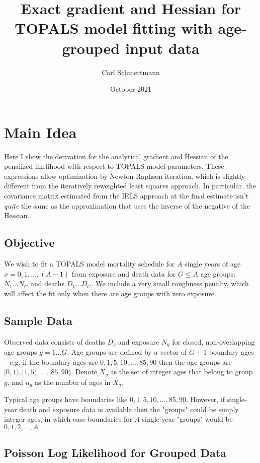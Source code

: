 \documentclass{article}
\title{Exact gradient and Hessian for TOPALS model fitting with age-grouped input data}
\author{Carl Schmertmann}
\date{October 2021}
\begin{document}
\maketitle



\section{Main Idea}

Here I show the derivation for the analytical gradient and Hessian of the penalized likelihood with respect to TOPALS model parameters. These expressions allow optimization by Newton-Raphson iteration, which is slightly different from the iteratively reweighted least squares approach. In particular, the covariance matrix estimated from the IRLS approach at the final estimate isn't \textit{quite} the same as the approximation that uses the inverse of the negative of the Hessian.

\subsection{Objective}

We wish to fit a TOPALS model mortality schedule for $A$ single years of age $x=0,1,\ldots,(A-1)$ from exposure and death data for $G\le A$ age groups: $N_1\ldots N_G$ and deaths $D_1\ldots D_G$. We include a very small roughness penalty, which will affect the fit only when there are age groups with zero exposure. 

\subsection{Sample Data}

Observed data consists of deaths $D_g$ and exposure $N_g$ for closed, non-overlapping age groups $g=1\ldots G$. Age groups are defined by a vector of $G+1$ boundary ages -- e.g. if the boundary ages are $0,1,5,10,\ldots,85,90$ then the age groups are $[0,1), [1,5),\ldots,[85,90)$. Denote $X_g$ as the set of integer ages that belong to group $g$, and $n_g$ as the number of ages in $X_g$.  

Typical age groups have boundaries like $0,1,5,10,\ldots,85,90$. However, if single-year death and exposure data is available then the "groups" could be simply integer ages, in which case boundaries for $A$ single-year "groups" would be $0,1,2,\ldots,A$ 

\subsection{Poisson Log Likelihood for Grouped Data}
\end{document}
